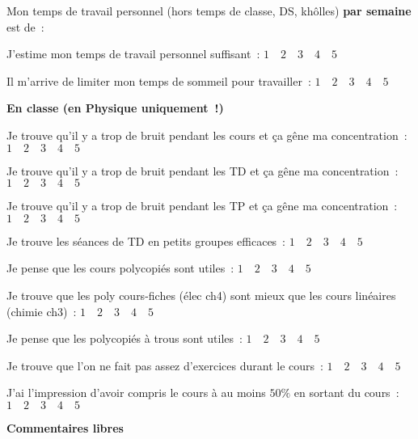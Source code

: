 \documentclass[a4paper, 10pt, final, garamond]{book}
\begin{document}
\medskip
\noindent
{}  Mon temps de travail personnel (hors temps de classe, DS, khôlles) \textbf{par semaine} est de~: 


\medskip
\noindent
{}  J'estime mon temps de travail personnel suffisant~: $1 \quad 2 \quad 3 \quad 4 \quad 5$

\medskip
\noindent
{}  Il m'arrive de limiter mon temps de sommeil pour travailler~: $1 \quad 2 \quad 3 \quad 4 \quad 5$

\medskip
\noindent
\textbf{En classe (en Physique uniquement~!)}

\medskip
\noindent
{}  Je trouve qu'il y a trop de bruit pendant les cours et ça gêne ma concentration~: $1 \quad 2 \quad 3 \quad 4 \quad 5$

\medskip
\noindent
{}  Je trouve qu'il y a trop de bruit pendant les TD et ça gêne ma concentration~: $1 \quad 2 \quad 3 \quad 4 \quad 5$

\medskip
\noindent
{}  Je trouve qu'il y a trop de bruit pendant les TP et ça gêne ma concentration~: $1 \quad 2 \quad 3 \quad 4 \quad 5$

\medskip
\noindent
{}  Je trouve les séances de TD en petits groupes efficaces~: $1 \quad 2 \quad 3 \quad 4 \quad 5$

\medskip
\noindent
{}  Je pense que les cours polycopiés sont utiles~: $1 \quad 2 \quad 3 \quad 4 \quad 5$

\medskip
\noindent
{}  Je trouve que les poly cours-fiches (élec ch4) sont mieux que les
cours linéaires (chimie ch3)~: $1 \quad 2 \quad 3 \quad 4 \quad 5$

\medskip
\noindent
{}  Je pense que les polycopiés à trous sont utiles~: $1 \quad 2 \quad 3 \quad 4 \quad 5$

\medskip
\noindent
{}  Je trouve que l'on ne fait pas assez d'exercices durant le cours~: $1 \quad 2 \quad 3 \quad 4 \quad 5$

\medskip
\noindent
{}  J'ai l'impression d'avoir compris le cours à au moins $50 \%$ en sortant du cours~: $1 \quad 2 \quad 3 \quad 4 \quad 5$

\medskip
\noindent
\textbf{Commentaires libres}
 
\end{document}
